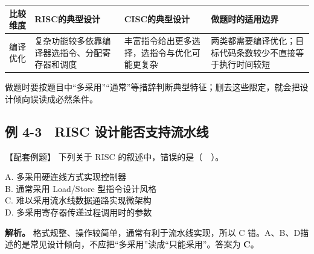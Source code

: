 \begin{wideblock}\par\medskip\noindent\begin{minipage}{\linewidth}\fontsize{9.3}{12}\selectfont\begin{tabularx}{\linewidth}{@{}YYYY@{}}
\toprule\noalign{}
\begin{minipage}[b]{\linewidth}\raggedright
比较维度
\end{minipage} & \begin{minipage}[b]{\linewidth}\raggedright
RISC的典型设计
\end{minipage} & \begin{minipage}[b]{\linewidth}\raggedright
CISC的典型设计
\end{minipage} & \begin{minipage}[b]{\linewidth}\raggedright
做题时的适用边界
\end{minipage} \\
\midrule\noalign{}


编译优化 & 复杂功能较多依靠编译器选指令、分配寄存器和调度 & 丰富指令给出更多选择，选指令与优化可能更复杂 & 两类都需要编译优化；目标代码条数较少不直接等于执行时间较短 \\
\bottomrule\end{tabularx}
\end{minipage}\par\medskip\end{wideblock}

做题时要按题目中``多采用''``通常''等措辞判断典型特征；删去这些限定，就会把设计倾向误读成必然条件。

\subsection{例 4-3　RISC 设计能否支持流水线}\label{CO04-08}

\begin{example}[配套例题]

【配套例题】 下列关于 RISC 的叙述中，错误的是（　）。

A. 多采用硬连线方式实现控制器\\
B. 通常采用 Load/Store 型指令设计风格\\
C. 难以采用流水线数据通路实现微架构\\
D. 多采用寄存器传递过程调用时的参数

\end{example}

\textbf{解析。} 格式规整、操作较简单，通常有利于流水线实现，所以 C 错。A、B、D描述的是常见设计倾向，不应把``多采用''读成``只能采用''。答案为 \textbf{C}。

